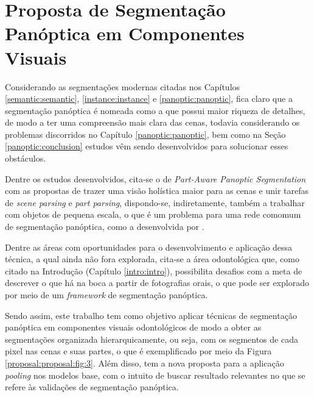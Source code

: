 \newpage
\clearpage

\section{Proposta de Segmentação Panóptica em Componentes Visuais}
\label{proposal:proposal}

Considerando as segmentações modernas citadas nos Capítulos \ref{semantic:semantic}, \ref{instance:instance} e \ref{panoptic:panoptic}, fica claro que a segmentação panóptica é nomeada como a que possui maior riqueza de detalhes, de modo a ter uma compreensão mais clara das cenas, todavia considerando os problemas discorridos no Capítulo \ref{panoptic:panoptic}, bem como na Seção \ref{panoptic:conclusion} estudos vêm sendo desenvolvidos para solucionar esses obstáculos.

\begin{sloppypar}
Dentre os estudos desenvolvidos, cita-se o de \textit{Part-Aware Panoptic Segmentation} \cite{DeGeus2021} com as propostas de trazer uma visão holística maior para as cenas e unir tarefas de \textit{scene parsing} e \textit{part parsing}, dispondo-se, indiretamente, também a trabalhar com objetos de pequena escala, o que é um problema para uma rede comomum de segmentação panóptica, como a desenvolvida por \cite{Kirillov2019a}.
\end{sloppypar}

Dentre as áreas com oportunidades para o desenvolvimento e aplicação dessa técnica, a qual ainda não fora explorada, cita-se a área odontológica que, como citado na Introdução (Capítulo \ref{intro:intro}), possibilita desafios com a meta de descrever o que há na boca a partir de fotografias orais, o que pode ser explorado por meio de um \textit{framework} de segmentação panóptica.

Sendo assim, este trabalho tem como objetivo aplicar técnicas de segmentação panóptica em componentes visuais odontológicos de modo a obter as segmentações organizada hierarquicamente, ou seja, com os segmentos de cada pixel nas cenas e suas partes, o que é exemplificado por meio da Figura \ref{proposal:proposal:fig:3}. Além disso, tem a nova proposta para a aplicação \textit{pooling} nos modelos base, com o intuito de buscar resultado relevantes no que se refere às validações de segmentação panóptica.


